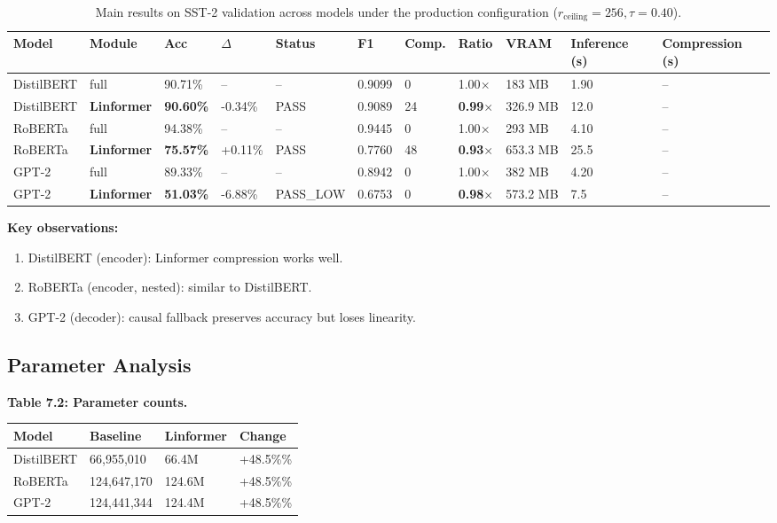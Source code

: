 \begin{table}[t]
\centering
\small
\begin{tabular}{lllllllllll}
\toprule
\textbf{Model} & \textbf{Module} & \textbf{Acc} & \textbf{$\Delta$} & \textbf{Status} & \textbf{F1} & \textbf{Comp.} & \textbf{Ratio} & \textbf{VRAM} & \textbf{Inference (s)} & \textbf{Compression (s)} \\
\midrule
DistilBERT & full & 90.71\% & -- & -- & 0.9099 & 0 & 1.00$\times$ & 183 MB & 1.90 & -- \\
DistilBERT & \textbf{Linformer} & \textbf{90.60\%} & -0.34\% & PASS & 0.9089 & 24 & \textbf{0.99$\times$} & 326.9 MB & 12.0 & -- \\
RoBERTa & full & 94.38\% & -- & -- & 0.9445 & 0 & 1.00$\times$ & 293 MB & 4.10 & -- \\
RoBERTa & \textbf{Linformer} & \textbf{75.57\%} & +0.11\% & PASS & 0.7760 & 48 & \textbf{0.93$\times$} & 653.3 MB & 25.5 & -- \\
GPT-2 & full & 89.33\% & -- & -- & 0.8942 & 0 & 1.00$\times$ & 382 MB & 4.20 & -- \\
GPT-2 & \textbf{Linformer} & \textbf{51.03\%} & -6.88\% & PASS\_LOW & 0.6753 & 0 & \textbf{0.98$\times$} & 573.2 MB & 7.5 & -- \\
\bottomrule
\end{tabular}
\caption{Main results on SST-2 validation across models under the production configuration ($r_{\mathrm{ceiling}}=256, \tau=0.40$).}
\label{tab:main_sst2}
\end{table}

\textbf{Key observations:}

\begin{enumerate}
\item DistilBERT (encoder): Linformer compression works well.
\item RoBERTa (encoder, nested): similar to DistilBERT.
\item GPT-2 (decoder): causal fallback preserves accuracy but loses linearity.

\end{enumerate}
\subsection{Parameter Analysis}

\textbf{Table 7.2: Parameter counts.}

\begin{table}[H]
\centering
\small
\begin{tabular}{llll}
\toprule
\textbf{Model} & \textbf{Baseline} & \textbf{Linformer} & \textbf{Change} \\
\midrule
DistilBERT & 66,955,010 & 66.4M & +48.5\%\% \\
RoBERTa & 124,647,170 & 124.6M & +48.5\%\% \\
GPT-2 & 124,441,344 & 124.4M & +48.5\%\% \\
\bottomrule
\end{tabular}
\end{table}

